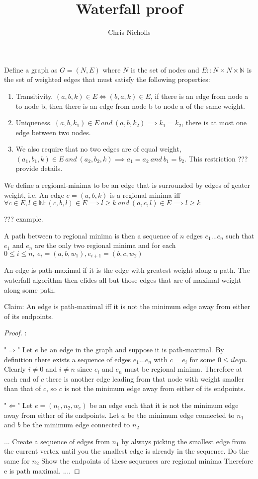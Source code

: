 \documentclass{journal}
\title{\LARGE \bf
Waterfall proof
}
\author{Chris Nicholls
}
\begin{document}
Define a graph as $G = (N,E)$
where $N$ is the set of nodes and $E :: N\times N \times \mathbb{N}$ is the set of weighted edges
that must satisfy the following properties:
\begin{enumerate}
\item Transitivity. $(a,b,k) \in E  \iff (b,a,k) \in E$, if there is an edge from node a to node b, then there is an edge from node b to node a of the same weight.
\item Uniqueness.   $(a,b,k_1) \in E\ and\ (a,b,k_2) \implies k_1 = k_2$, there is at most one edge between two nodes.
\item We also require that no two edges are of equal weight, $(a_1,b_1,k) \in E\ and\ (a_2,b_2,k) \implies a_1 = a_2\ and\ b_1 = b_2$. This restriction ??? provide details.

\end{enumerate}

We define a regional-minima to be an edge that is surrounded by edges of geater weight, i.e.
An edge $e = (a,b,k)$ is a regional minima iff
$\forall c \in E, l \in \mathbb{N} :
  (c,b,l) \in E \implies l \geq k\ and\
  (a,c,l) \in E \implies l \geq k $

??? example.

A path between to regional minima is then a sequence of $n$ edges $e_1 ... e_n$
such that $e_1$ and $e_n$ are the only two regional minima
and for each $ 0 \leq i \le n,\ e_i = (a,b,w_1) , e_{i+1} = (b,c,w_2)$

\noindent An edge is path-maximal if it is the edge with greatest weight along a path.
The waterfall algorithm then elides all but those edges that are of maximal weight along some path.

\noindent Claim: An edge is path-maximal iff it is not the minimum edge away from either of its endpoints.

\begin{proof}:

\noindent "$\Rightarrow$"
\indent
  Let $e$ be an edge in the graph and suppose it is path-maximal.
  By definition there exists a sequence of edges $e_1 ... e_n$
  with $c = e_i$ for some $ 0 \leq i leq n$. Clearly $i \neq 0$ and $i \neq n$ since
  $e_i$ and $e_n$ must be regional minima. Therefore at each end of $c$ there is another edge
  leading from that node with weight smaller than that of $c$, so $c$ is
  not the minimum edge away from either of its endpoints.

"$\Leftarrow$"
  Let $e = (n_1,n_2,w_e)$ be an edge such that it is not the minimum edge away from either of its endpoints.
  Let  $a$ be the minimum edge connected to $n_1$ and $b$ be the minimum edge connected to $n_2$

  ...
  Create a sequence of edges from $n_1$ by always picking the smallest edge from the current vertex until
  you the smallest edge is already in the sequence.
  Do  the same for $n_2$
  Show the endpoints of these sequences are regional minima
  Therefore e is path maximal.
  ....


\end{proof}
\end{document}
